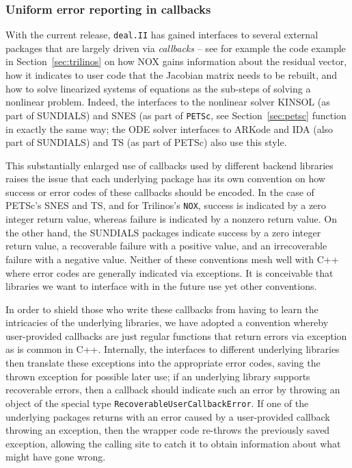 \documentclass{ansarticle-preprint}
\newcommand{\specialword}[1]{\texttt{#1}}
\newcommand{\dealii}{{\specialword{deal.II}}\xspace}
\begin{document}
\subsubsection{Uniform error reporting in callbacks}\label{sec:callbacks}

With the current release, \dealii{} has gained interfaces to several
external packages that are largely driven via \textit{callbacks} --
see for example the code example in Section~\ref{sec:trilinos} on how
NOX gains information about the residual vector, how it indicates to
user code that the Jacobian matrix needs to be rebuilt,
and how to solve linearized systems of equations as the sub-steps of
solving a nonlinear problem. Indeed, the interfaces to the nonlinear
solver KINSOL (as part of SUNDIALS) and SNES (as part of \texttt{PETSc}, see
Section~\ref{sec:petsc} function in exactly the same way; the
ODE solver interfaces to ARKode and IDA (also part of SUNDIALS) and TS
(as part of PETSc) also use this style.

This substantially enlarged use of callbacks used by different backend
libraries raises the issue that each underlying package has its own
convention on how success or error codes of these callbacks should be
encoded. In the case of PETSc's SNES and TS, and for Trilinos's \texttt{NOX},
success is indicated by a zero integer return value, whereas failure is
indicated by a nonzero return value. On the other hand, the SUNDIALS
packages indicate success by a zero integer return value, a
recoverable failure with a positive value, and an irrecoverable failure
with a negative value. Neither of these conventions mesh well with C++
where error codes are generally indicated via exceptions.
It is conceivable that libraries we want to
interface with in the future use yet other conventions.

In order to shield those who write these callbacks from having to
learn the intricacies of the underlying libraries, we have adopted a
convention whereby user-provided callbacks are just regular functions
that return errors via exception as is common in C++. Internally, the
interfaces to different underlying libraries then translate these
exceptions into the appropriate error codes, saving the thrown exception for possible
later use; if an underlying library supports
recoverable errors, then a callback should indicate such an error by
throwing an object of the special type
\texttt{RecoverableUserCallbackError}. If one of the underlying
packages returns with an error caused by a user-provided callback
throwing an exception, then the wrapper code re-throws the previously
saved exception, allowing the calling site to catch it to obtain information
about what might have gone wrong.
\end{document}

